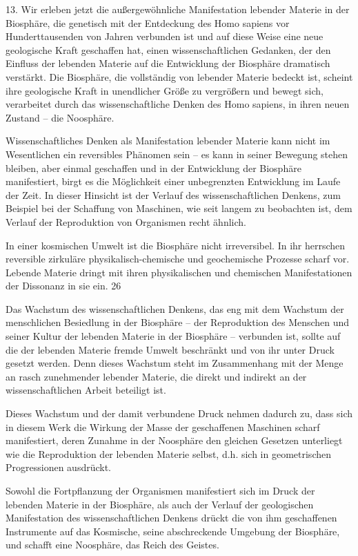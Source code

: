 \documentclass[11pt,a4paper]{book}
\begin{document}
13. Wir erleben jetzt die außergewöhnliche Manifestation lebender Materie in der Biosphäre, die genetisch mit der Entdeckung des Homo sapiens vor Hunderttausenden von Jahren verbunden ist und auf diese Weise eine neue geologische Kraft geschaffen hat, einen wissenschaftlichen Gedanken, der den Einfluss der lebenden Materie auf die Entwicklung der Biosphäre dramatisch verstärkt. Die Biosphäre, die vollständig von lebender Materie bedeckt ist, scheint ihre geologische Kraft in unendlicher Größe zu vergrößern und bewegt sich, verarbeitet durch das wissenschaftliche Denken des Homo sapiens, in ihren neuen Zustand -- die Noosphäre. 

Wissenschaftliches Denken als Manifestation lebender Materie kann nicht im Wesentlichen ein reversibles Phänomen sein -- es kann in seiner Bewegung stehen bleiben, aber einmal geschaffen und in der Entwicklung der Biosphäre manifestiert, birgt es die Möglichkeit einer unbegrenzten Entwicklung im Laufe der Zeit. In dieser Hinsicht ist der Verlauf des wissenschaftlichen Denkens, zum Beispiel bei der Schaffung von Maschinen, wie seit langem zu beobachten ist, dem Verlauf der Reproduktion von Organismen recht ähnlich. 

In einer kosmischen Umwelt ist die Biosphäre nicht irreversibel. In ihr herrschen reversible zirkuläre physikalisch-chemische und geochemische Prozesse scharf vor. Lebende Materie dringt mit ihren physikalischen und chemischen Manifestationen der Dissonanz in sie ein. 26 

Das Wachstum des wissenschaftlichen Denkens, das eng mit dem Wachstum der menschlichen Besiedlung in der Biosphäre -- der Reproduktion des Menschen und seiner Kultur der lebenden Materie in der Biosphäre -- verbunden ist, sollte auf die der lebenden Materie fremde Umwelt beschränkt und von ihr unter Druck gesetzt werden. Denn dieses Wachstum steht im Zusammenhang mit der Menge an rasch zunehmender lebender Materie, die direkt und indirekt an der wissenschaftlichen Arbeit beteiligt ist. 

Dieses Wachstum und der damit verbundene Druck nehmen dadurch zu, dass sich in diesem Werk die Wirkung der Masse der geschaffenen Maschinen scharf manifestiert, deren Zunahme in der Noosphäre den gleichen Gesetzen unterliegt wie die Reproduktion der lebenden Materie selbst, d.h. sich in geometrischen Progressionen ausdrückt. 

Sowohl die Fortpflanzung der Organismen manifestiert sich im Druck der lebenden Materie in der Biosphäre, als auch der Verlauf der geologischen Manifestation des wissenschaftlichen Denkens drückt die von ihm geschaffenen Instrumente auf das Kosmische, seine abschreckende Umgebung der Biosphäre, und schafft eine Noosphäre, das Reich des Geistes. 
\end{document}
